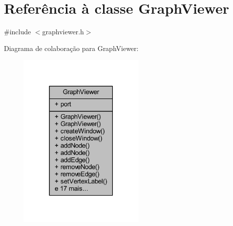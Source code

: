 \hypertarget{class_graph_viewer}{}\section{Referência à classe Graph\+Viewer}
\label{class_graph_viewer}


{\ttfamily \#include $<$graphviewer.\+h$>$}



Diagrama de colaboração para Graph\+Viewer\+:
\nopagebreak
\begin{figure}[H]
\begin{center}
\leavevmode
\includegraphics[width=177pt]{class_graph_viewer__coll__graph}
\end{center}
\end{figure}

